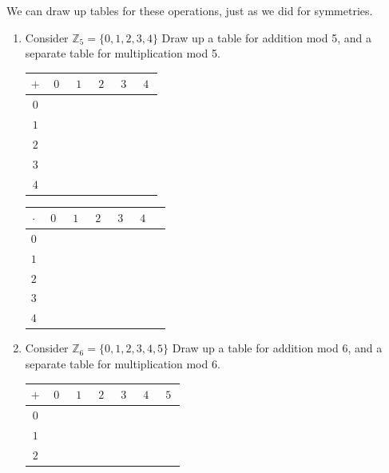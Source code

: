 We can draw up tables for these operations, just as we did for symmetries.
\begin{enumerate}
    \item Consider $\mathbb{Z}_5 = \{0,1,2,3,4\}$ Draw up a table for addition mod 5, and a separate table for multiplication mod 5.
    \begin{center}
  \renewcommand{\arraystretch}{1.7}
    \begin{tabular}{|c||c|c|c|c|c|} \hline
        $+$ & $0$ & $1$ & $2$ & $3$ & $4$  \\ \hline \hline
        $0$ & $\phantom{00}$ & $\phantom{00}$ & $\phantom{00}$ & $\phantom{00}$ & $\phantom{00}$ \\ \hline
        $1$ & & & & &  \\ \hline
        $2$ & & & & &  \\ \hline
        $3$ & & & & &  \\ \hline
        $4$ & & & & &  \\ \hline
    \end{tabular}
    \hspace{0.5in}
    \begin{tabular}{|c||c|c|c|c|c|c|} \hline
        $\cdot$ & $0$ & $1$ & $2$ & $3$ & $4$  \\ \hline \hline
        $0$ & $\phantom{00}$ & $\phantom{00}$ & $\phantom{00}$ & $\phantom{00}$ & $\phantom{00}$ \\ \hline
        $1$ & & & & &  \\ \hline
        $2$ & & & & &  \\ \hline
        $3$ & & & & &  \\ \hline
        $4$ & & & & &  \\ \hline
    \end{tabular}
    \end{center}
    \item Consider $\mathbb{Z}_6 = \{0,1,2,3,4,5\}$ Draw up a table for addition mod 6, and a separate table for multiplication mod 6.
    \begin{center}
  \renewcommand{\arraystretch}{1.7}
    \begin{tabular}{|c||c|c|c|c|c|c|} \hline
        $+$ & $0$ & $1$ & $2$ & $3$ & $4$ & $5$ \\ \hline \hline
        $0$ & $\phantom{00}$ & $\phantom{00}$ & $\phantom{00}$ & $\phantom{00}$ & $\phantom{00}$ & $\phantom{00}$ \\ \hline
        $1$ & & & & & & \\ \hline
        $2$ & & & & & & \\ \hline

\end{tabular}
\end{center}
\end{enumerate}
